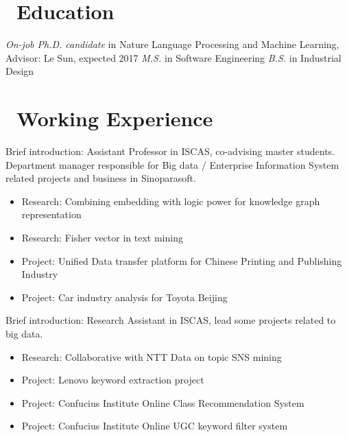 \documentclass{resume}
\begin{document}


 
\section{\faGraduationCap\ Education}
\textit{On-job Ph.D. candidate} in Nature Language Processing and Machine Learning,  Advisor: Le Sun, expected 2017
\textit{M.S.} in  Software Engineering
\textit{B.S.} in Industrial Design

\section{\faUsers\ Working Experience}
Brief introduction: Assistant Professor in ISCAS, co-advising master students. Department manager responsible for Big data / Enterprise Information System related projects and business in Sinoparasoft.
\begin{itemize}
  \item Research: Combining embedding with logic power for knowledge graph representation
  \item Research: Fisher vector in text mining
  \item Project: Unified Data transfer platform for Chinese Printing and Publishing Industry
  \item Project: Car industry analysis for Toyota Beijing
\end{itemize}

Brief introduction: Research Assistant in ISCAS, lead some projects related to big data.
\begin{itemize}
  \item Research: Collaborative with NTT Data on topic SNS mining
  \item Project: Lenovo keyword extraction project
  \item Project: Confucius Institute Online Class Recommendation System
  \item Project: Confucius Institute Online UGC keyword filter system
\end{itemize}
\end{document}
